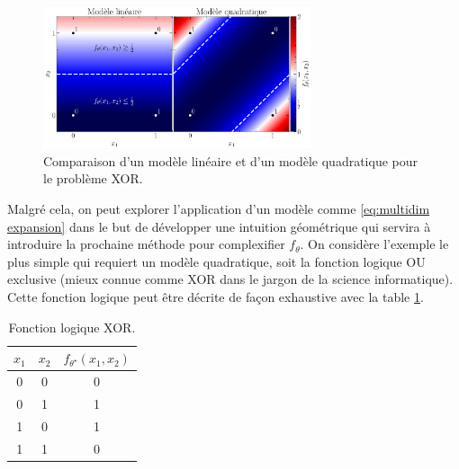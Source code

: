 \begin{figure}[ht!]
        \centering
        \includegraphics[width=0.7\textwidth]{notebooks/xor.pdf}
        \caption{Comparaison d'un modèle linéaire et d'un modèle quadratique pour le problème XOR.}
        \label{fig:xor}
\end{figure}

Malgré cela, on peut explorer l'application d'un modèle comme \eqref{eq:multidim expansion} dans le but de développer 
une intuition géométrique qui servira à introduire la prochaine méthode pour complexifier $f_\theta$.
On considère l'exemple le plus simple qui requiert un modèle quadratique, 
soit la fonction logique OU exclusive (mieux connue comme XOR dans le jargon de la science informatique). Cette fonction logique peut être 
décrite de façon exhaustive avec la table \ref{tab:xor}.
\begin{table}[ht!]
        \centering
        \begin{tabular}{ccc}
                $x_1$ & $x_2$ & $f_{\theta^{\star}}(x_1, x_2)$  \\\hline
                0 & 0 & 0 \\ 
                0 & 1 & 1 \\
                1 & 0 & 1 \\
                1 & 1 & 0 \\\hline
        \end{tabular}
        \caption{Fonction logique XOR.}
        \label{tab:xor}
\end{table}



